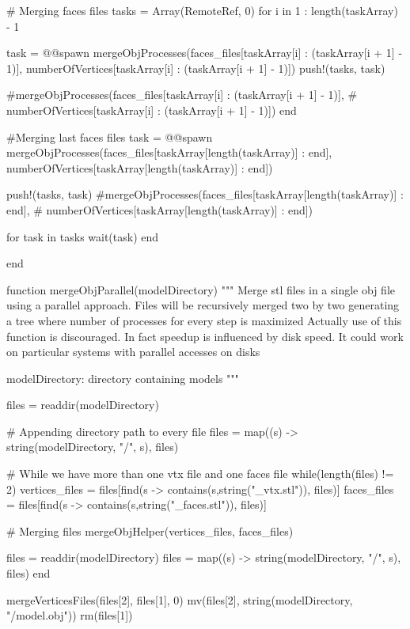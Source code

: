 \documentclass[11pt,oneside]{article}	%
\begin{document}
{  # Merging faces files
  tasks = Array(RemoteRef, 0)
  for i in 1 : length(taskArray) - 1

    task = @@spawn mergeObjProcesses(faces_files[taskArray[i] : (taskArray[i + 1] - 1)],
                                    numberOfVertices[taskArray[i] : (taskArray[i + 1] - 1)])
    push!(tasks, task)

    #mergeObjProcesses(faces_files[taskArray[i] : (taskArray[i + 1] - 1)],
    #                  numberOfVertices[taskArray[i] : (taskArray[i + 1] - 1)])
  end

  #Merging last faces files
  task = @@spawn mergeObjProcesses(faces_files[taskArray[length(taskArray)] : end],
                                  numberOfVertices[taskArray[length(taskArray)] : end])

  push!(tasks, task)
  #mergeObjProcesses(faces_files[taskArray[length(taskArray)] : end],
  #                    numberOfVertices[taskArray[length(taskArray)] : end])

  for task in tasks
    wait(task)
  end

end

function mergeObjParallel(modelDirectory)
  """
  Merge stl files in a single obj file using a parallel
  approach. Files will be recursively merged two by two
  generating a tree where number of processes for every
  step is maximized
  Actually use of this function is discouraged. In fact
  speedup is influenced by disk speed. It could work on
  particular systems with parallel accesses on disks

  modelDirectory: directory containing models
  """

  files = readdir(modelDirectory)

  # Appending directory path to every file
  files = map((s) -> string(modelDirectory, "/", s), files)

  # While we have more than one vtx file and one faces file
  while(length(files) != 2)
    vertices_files = files[find(s -> contains(s,string("_vtx.stl")), files)]
    faces_files = files[find(s -> contains(s,string("_faces.stl")), files)]

    # Merging files
    mergeObjHelper(vertices_files, faces_files)

    files = readdir(modelDirectory)
    files = map((s) -> string(modelDirectory, "/", s), files)
  end

  mergeVerticesFiles(files[2], files[1], 0)
  mv(files[2], string(modelDirectory, "/model.obj"))
  rm(files[1])

}
\end{document}
